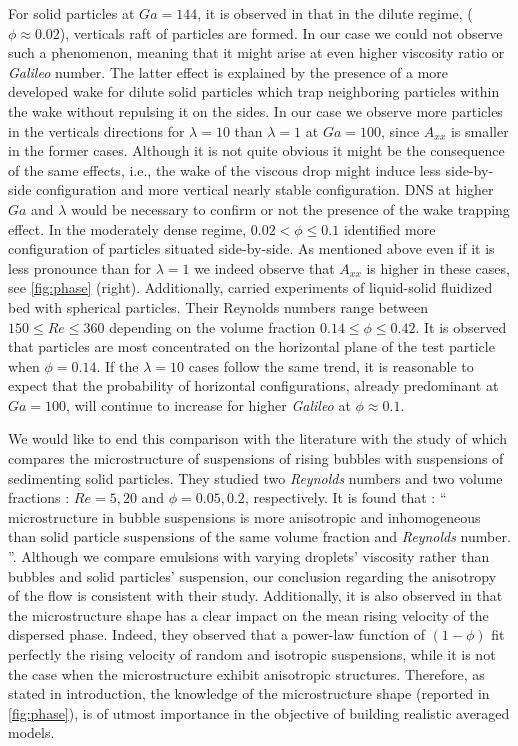For solid particles at $Ga = 144$, it is observed in \citet{shajahan2023inertial} that in the dilute regime, ($\phi \approx 0.02$), verticals raft of particles are formed. 
In our case we could not observe such a phenomenon, meaning that it might arise at even higher viscosity ratio or \textit{Galileo} number. 
The latter effect is explained by the presence of a more developed wake for dilute solid particles which trap neighboring particles within the wake without repulsing it on the sides. 
In our case we observe more particles in the verticals directions for $\lambda = 10$ than $\lambda =1$ at $Ga =100$, since $A_{xx}$ is smaller in the former cases.
Although it is not quite obvious it might be the consequence of the same effects, i.e., the wake of the viscous drop might induce less side-by-side configuration and more vertical nearly stable configuration. 
DNS at higher $Ga$ and $\lambda$ would be necessary to confirm or not the presence of the wake trapping effect.  
In the moderately dense regime,  $0.02 < \phi \le 0.1$  \citet{shajahan2023inertial} identified more configuration of particles situated side-by-side. 
As mentioned above even if it is less pronounce than for $\lambda = 1$ we indeed observe that $A_{xx}$ is higher in these cases, see \ref{fig:phase} (right). 
Additionally, \citet{almeras2021statistics} carried experiments of liquid-solid fluidized bed with spherical particles. 
Their Reynolds numbers range between $150\leq Re \leq 360$ depending on the volume fraction $0.14 \leq \phi \leq 0.42$.
It is observed that particles are most concentrated on the horizontal plane of the test particle when $\phi = 0.14$.
If the $\lambda = 10$ cases follow the same trend, it is reasonable to expect that the probability of horizontal configurations, already predominant at $Ga =100$, will continue to increase for higher \textit{Galileo} at $\phi  \approx 0.1$. 


We would like to end this comparison with the literature with the study of \citet{yin2008lattice} which compares the microstructure of suspensions of rising bubbles with suspensions of sedimenting solid particles.
They studied two \textit{Reynolds} numbers and two volume fractions : $Re = 5,20$ and  $\phi = 0.05, 0.2$, respectively.
It is found that : 
\enquote{    
     microstructure in bubble
    suspensions is more anisotropic and inhomogeneous than
    solid particle suspensions of the same volume fraction and
    \textit{Reynolds} number.    
}. 
Although we compare emulsions with varying droplets' viscosity rather than bubbles and solid particles' suspension, our conclusion regarding the anisotropy of the flow is consistent with their study.
Additionally, it is also observed in \citet{yin2008lattice} that the microstructure shape has a clear impact on the mean rising velocity of the dispersed phase.
Indeed, they observed that a power-law function of $(1-\phi)$ fit perfectly the rising velocity of random and isotropic suspensions, while it is not the case when the microstructure exhibit anisotropic structures. 
Therefore, as stated in introduction, the knowledge of the microstructure shape (reported in \ref{fig:phase}), is of utmost importance in the objective of building realistic averaged models. 

